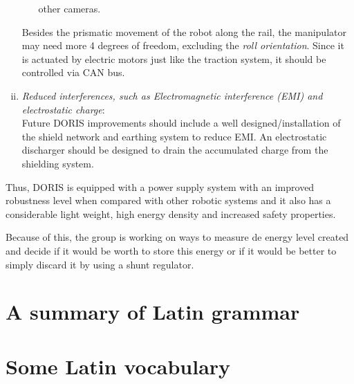 \documentclass{ifacconf}
\begin{document}
\begin{enumerate}[i)]
\begin{itemize}
    other cameras.
  \end{itemize}
  Besides the prismatic movement of the robot along the rail, the manipulator
  may need more 4 degrees of freedom, excluding the \emph{roll orientation}.
  Since it is actuated by electric motors just like the traction system, it
  should be controlled via CAN bus.\\
  \item \emph{Reduced interferences, such as Electromagnetic interference (EMI) and electrostatic charge}:\\
  \newline
  Future DORIS improvements should include a well designed/installation of the
  shield network and earthing system to reduce EMI. An electrostatic discharger
  should be designed to drain the accumulated charge from the shielding system.
\end{enumerate}

Thus, DORIS is equipped with a power supply system with an improved robustness
level when compared with other robotic systems and it also has a considerable
light weight, high energy density and increased safety properties.
 
Because of this, the group is
working on ways to measure de energy level created and decide if it would be
worth to store this energy or if it would be better to simply discard it by
using a shunt regulator.


             

\appendix
\section{A summary of Latin grammar}    %
\section{Some Latin vocabulary}              %
\end{document}
